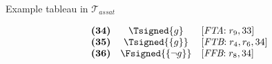 \begin{frame}{Example tableau in $\mathcal{T}_{\textit{assat}}$}
\begin{center}
\begin{minipage}[t]{16cm}
\begin{minipage}[t]{6cm}
\begin{minipage}[t]{2cm}
\[\begin{array}{lcl}
\textbf{(34)}                                      &
  \Tsigned{g}                                      &
  [\textit{FTA}{:}\;r_9, \text{33}]                \\
\textbf{(35)}                                      &
  \Tsigned{\{g\}}                                  &
  [\textit{FTB}{:}\;r_4, r_6, \text{34}]           \\
\textbf{(36)}                                      &
  \Fsigned{\{\neg g\}}                     &
  [\textit{FFB}{:}\;r_8, \text{34}]
\end{array}
\]
\end{minipage}
\end{minipage}
\end{minipage}
\end{center}
\end{frame}
